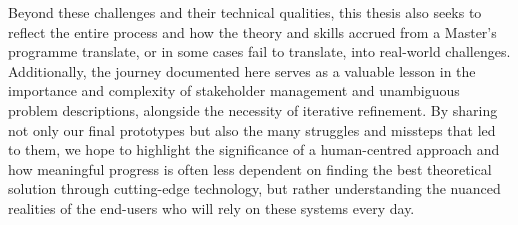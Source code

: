 Beyond these challenges and their technical qualities, this thesis also seeks to reflect the entire process and how the theory and skills accrued from a Master's programme translate, or in some cases fail to translate, into real-world challenges. Additionally, the journey documented here serves as a valuable lesson in the importance and complexity of stakeholder management and unambiguous problem descriptions, alongside the necessity of iterative refinement. By sharing not only our final prototypes but also the many struggles and missteps that led to them, we hope to highlight the significance of a human-centred approach and how meaningful progress is often less dependent on finding the best theoretical solution through cutting-edge technology, but rather understanding the nuanced realities of the end-users who will rely on these systems every day.
